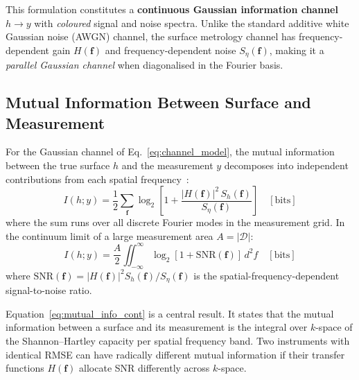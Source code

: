\documentclass[review,12pt]{elsarticle}
\begin{document}
This formulation constitutes a \textbf{continuous Gaussian information channel} $h \to y$ with \emph{coloured} signal and noise spectra. Unlike the standard additive white Gaussian noise (AWGN) channel, the surface metrology channel has frequency-dependent gain $H(\mathbf{f})$ and frequency-dependent noise $S_\eta(\mathbf{f})$, making it a \emph{parallel Gaussian channel} when diagonalised in the Fourier basis.

\subsection{Mutual Information Between Surface and Measurement}

For the Gaussian channel of Eq.~\ref{eq:channel_model}, the mutual information between the true surface $ h$ and the measurement $y$ decomposes into independent contributions from each spatial frequency~\cite{cover2006elements}:
\begin{equation}
    I(h; y) = \frac{1}{2} \sum_{\mathbf{f}} \log_2\!\left[1 + \frac{|H(\mathbf{f})|^2 \, S_h(\mathbf{f})}{S_\eta(\mathbf{f})}\right] \quad [\text{bits}]
    \label{eq:mutual_info}
\end{equation}
where the sum runs over all discrete Fourier modes in the measurement grid. In the continuum limit of a large measurement area $A = |\mathcal{D}|$:
\begin{equation}
    I(h; y) = \frac{A}{2} \iint_{-\infty}^{\infty} \log_2\!\left[1 + \mathrm{SNR}(\mathbf{f})\right] \, d^2\!f \quad [\text{bits}]
    \label{eq:mutual_info_cont}
\end{equation}
where $\mathrm{SNR}(\mathbf{f}) = |H(\mathbf{f})|^2 S_h(\mathbf{f}) / S_\eta(\mathbf{f})$ is the spatial-frequency-dependent signal-to-noise ratio.

Equation~\ref{eq:mutual_info_cont} is a central result. It states that the mutual information between a surface and its measurement is the integral over $ k$-space of the Shannon--Hartley capacity per spatial frequency band. Two instruments with identical RMSE can have radically different mutual information if their transfer functions $ H(\mathbf{f})$ allocate SNR differently across $k$-space.
\end{document}
